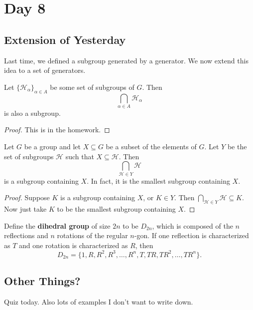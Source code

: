 \section{Day 8}

\subsection{Extension of Yesterday}

Last time, we defined a subgroup generated by a generator. We now extend
this idea to a set of generators.

\begin{prop}
Let $\lbrace\mathcal{H}_\alpha\rbrace_{\alpha \in A}$ be some set of
subgroups of $G$. Then
\[ \bigcap_{\alpha \in A} \mathcal{H}_\alpha \]
is also a subgroup.
\end{prop}

\begin{proof}
This is in the homework.
\end{proof}

\begin{prop}
Let $G$ be a group and let $X \subseteq G$ be a subset of the elements
of $G$. Let $Y$ be the set of subgroups $\mathcal{H}$ such that
$X \subseteq \mathcal{H}$. Then
\[ \bigcap_{\mathcal{H} \in Y} \mathcal{H} \]
is a subgroup containing $X$. In fact, it is the smallest subgroup
containing $X$.
\end{prop}

\begin{proof}
Suppose $K$ is a subgroup containing $X$, or $K \in Y$. Then
$\bigcap_{\mathcal{H} \in Y} \mathcal{H} \subseteq K$. Now just take $K$
to be the smallest subgroup containing $X$.
\end{proof}

\begin{df}
Define the \textbf{dihedral group} of size $2n$ to be $D_{2n}$, which is
composed of the $n$ reflections and $n$ rotations of the regular
$n$-gon. If one reflection is characterized as $T$ and one rotation is
characterized as $R$, then
\[ D_{2n} = \lbrace 1, R, R^2, R^3, \dots, R^n, T, TR, TR^2, \dots, TR^n
\rbrace. \]
\end{df}

\subsection{Other Things?}
Quiz today. Also lots of examples I don't want to write down.
